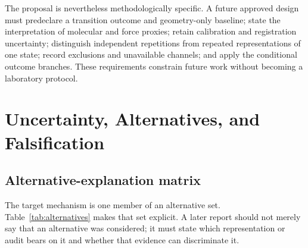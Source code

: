 \documentclass[conference]{IEEEtran}
\begin{document}
The proposal is nevertheless methodologically specific. A future approved design must predeclare a transition outcome and geometry-only baseline; state the interpretation of molecular and force proxies; retain calibration and registration uncertainty; distinguish independent repetitions from repeated representations of one state; record exclusions and unavailable channels; and apply the conditional outcome branches. These requirements constrain future work without becoming a laboratory protocol.

\section{Uncertainty, Alternatives, and Falsification}

\subsection{Alternative-explanation matrix}

The target mechanism is one member of an alternative set. Table~\ref{tab:alternatives} makes that set explicit. A later report should not merely say that an alternative was considered; it must state which representation or audit bears on it and whether that evidence can discriminate it.
\end{document}
